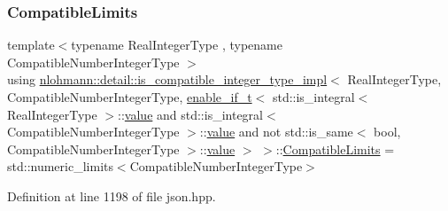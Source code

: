 \subsubsection{\texorpdfstring{CompatibleLimits}{CompatibleLimits}}
{\footnotesize\ttfamily template$<$typename Real\+Integer\+Type , typename Compatible\+Number\+Integer\+Type $>$ \\
using \mbox{\hyperlink{structnlohmann_1_1detail_1_1is__compatible__integer__type__impl}{nlohmann\+::detail\+::is\+\_\+compatible\+\_\+integer\+\_\+type\+\_\+impl}}$<$ Real\+Integer\+Type, Compatible\+Number\+Integer\+Type, \mbox{\hyperlink{namespacenlohmann_1_1detail_a02bcbc878bee413f25b985ada771aa9c}{enable\+\_\+if\+\_\+t}}$<$ std\+::is\+\_\+integral$<$ Real\+Integer\+Type $>$\+::\mbox{\hyperlink{structnlohmann_1_1detail_1_1is__compatible__integer__type__impl_3_01_real_integer_type_00_01_com5aa74bcf254245a639da00509f4d2655_a478242daac7a70e28c749bfec00d1c1b}{value}} and std\+::is\+\_\+integral$<$ Compatible\+Number\+Integer\+Type $>$\+::\mbox{\hyperlink{structnlohmann_1_1detail_1_1is__compatible__integer__type__impl_3_01_real_integer_type_00_01_com5aa74bcf254245a639da00509f4d2655_a478242daac7a70e28c749bfec00d1c1b}{value}} and not std\+::is\+\_\+same$<$ bool, Compatible\+Number\+Integer\+Type $>$\+::\mbox{\hyperlink{structnlohmann_1_1detail_1_1is__compatible__integer__type__impl_3_01_real_integer_type_00_01_com5aa74bcf254245a639da00509f4d2655_a478242daac7a70e28c749bfec00d1c1b}{value}} $>$ $>$\+::\mbox{\hyperlink{structnlohmann_1_1detail_1_1is__compatible__integer__type__impl_3_01_real_integer_type_00_01_com5aa74bcf254245a639da00509f4d2655_a002983b5c7c0f72b89d2151a6b39627d}{Compatible\+Limits}} =  std\+::numeric\+\_\+limits$<$Compatible\+Number\+Integer\+Type$>$}



Definition at line 1198 of file json.\+hpp.

